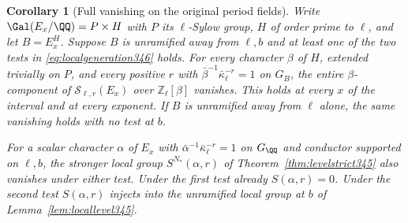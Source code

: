 \documentclass[a4paper,11pt]{article}
\newtheorem{corollary}[proposition]{Corollary}
\theoremstyle{definition}
\theoremstyle{remark}
\newcommand{\ZZ}{\mathbb Z}\newcommand{\ord}{\operatorname{ord}}
\numberwithin{equation}{section}
\begin{document}
\begin{corollary}[Full vanishing on the original period fields]\leavevmode\label{cor:periodblock346}
Write $\Gal(E_x/\QQ)=P\times H$ with $P$ its $\ell$-Sylow group,
$H$ of order prime to $\ell$, and let $B=E_x^H$. Suppose $B$
is unramified away from $\ell,b$ and at least one of the two
tests in \eqref{eq:localgeneration346} holds. For every character
$\beta$ of $H$, extended trivially on $P$, and every positive
$r$ with $\bar\beta^{-1}\bar\kappa_\ell^{-r}=1$ on $G_B$,
the entire $\beta$-component of $\mathcal S_{\ell,r}(E_x)$
over $\ZZ_\ell[\beta]$ vanishes. This holds at every $x$ of the
interval and at every exponent. If $B$ is unramified away from
$\ell$ alone, the same vanishing holds with no test at $b$.

For a scalar character $\alpha$ of $E_x$ with
$\bar\alpha^{-1}\bar\kappa_\ell^{-r}=1$ on $G_\QQ$ and conductor
supported on $\ell,b$, the stronger local group $S^{N_*}(\alpha,r)$
of Theorem~\ref{thm:levelstrict345} also vanishes under either
test. Under the first test already $S(\alpha,r)=0$. Under the
second test $S(\alpha,r)$ injects into the unramified local group
at $b$ of Lemma~\ref{lem:locallevel345}.
\end{corollary}
\end{document}
